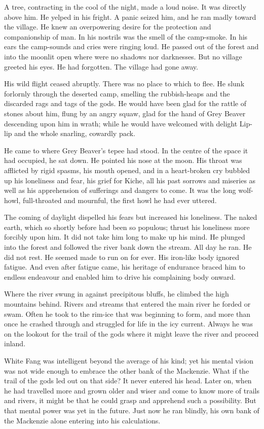 \documentclass[10pt]{book}
\begin{document}
A tree, contracting in the cool of the night, made a loud noise. It was
directly above him. He yelped in his fright. A panic seized him, and he
ran madly toward the village. He knew an overpowering desire for the
protection and companionship of man. In his nostrils was the smell of
the camp-smoke. In his ears the camp-sounds and cries were ringing
loud. He passed out of the forest and into the moonlit open where were
no shadows nor darknesses. But no village greeted his eyes. He had
forgotten. The village had gone away.

His wild flight ceased abruptly. There was no place to which to flee.
He slunk forlornly through the deserted camp, smelling the
rubbish-heaps and the discarded rags and tags of the gods. He would
have been glad for the rattle of stones about him, flung by an angry
squaw, glad for the hand of Grey Beaver descending upon him in wrath;
while he would have welcomed with delight Lip-lip and the whole
snarling, cowardly pack.

He came to where Grey Beaver’s tepee had stood. In the centre of the
space it had occupied, he sat down. He pointed his nose at the moon.
His throat was afflicted by rigid spasms, his mouth opened, and in a
heart-broken cry bubbled up his loneliness and fear, his grief for
Kiche, all his past sorrows and miseries as well as his apprehension of
sufferings and dangers to come. It was the long wolf-howl,
full-throated and mournful, the first howl he had ever uttered.

The coming of daylight dispelled his fears but increased his
loneliness. The naked earth, which so shortly before had been so
populous; thrust his loneliness more forcibly upon him. It did not take
him long to make up his mind. He plunged into the forest and followed
the river bank down the stream. All day he ran. He did not rest. He
seemed made to run on for ever. His iron-like body ignored fatigue. And
even after fatigue came, his heritage of endurance braced him to
endless endeavour and enabled him to drive his complaining body onward.

Where the river swung in against precipitous bluffs, he climbed the
high mountains behind. Rivers and streams that entered the main river
he forded or swam. Often he took to the rim-ice that was beginning to
form, and more than once he crashed through and struggled for life in
the icy current. Always he was on the lookout for the trail of the gods
where it might leave the river and proceed inland.

White Fang was intelligent beyond the average of his kind; yet his
mental vision was not wide enough to embrace the other bank of the
Mackenzie. What if the trail of the gods led out on that side? It never
entered his head. Later on, when he had travelled more and grown older
and wiser and come to know more of trails and rivers, it might be that
he could grasp and apprehend such a possibility. But that mental power
was yet in the future. Just now he ran blindly, his own bank of the
Mackenzie alone entering into his calculations.
\end{document}
